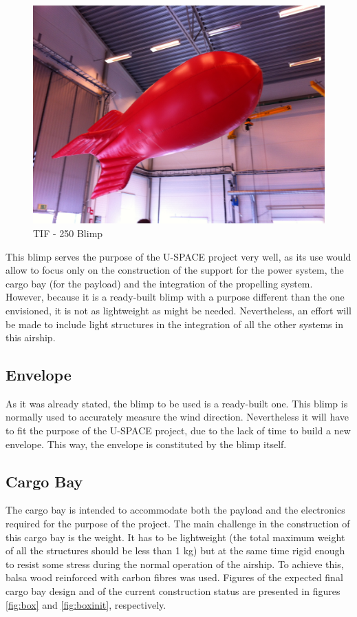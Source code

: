 \begin{figure}[bht]
\centering
\includegraphics[width=\textwidth]{figures/blimp.jpg}
\caption{TIF - 250 Blimp}
\label{fig:blimp}
\end{figure}



This blimp serves the purpose of the U-SPACE project very well, as its use would allow to focus only on the construction of the support for the power system, the cargo bay (for the payload) and the integration of the propelling system. However, because it is a ready-built blimp with a purpose different than the one envisioned, it is not as lightweight as might be needed. Nevertheless, an effort will be made to include light structures in the integration of all the other systems in this airship.

\subsection{Envelope}

As it was already stated, the blimp to be used is a ready-built one. This blimp is normally used to accurately measure the wind direction. Nevertheless it will have to fit the purpose of the U-SPACE project, due to the lack of time to build a new envelope. This way, the envelope is constituted by the blimp itself.  

\subsection{Cargo Bay}

The cargo bay is intended to accommodate both the payload and the electronics required for the purpose of the project. The main challenge in the construction of this cargo bay is the weight. It has to be lightweight (the total maximum weight of all the structures should be less than 1 kg) but at the same time rigid enough to resist some stress during the normal operation of the airship. To achieve this, balsa wood reinforced with carbon fibres was used. Figures of the expected final cargo bay design and of the current construction status are presented in figures \ref{fig:box} and \ref{fig:boxinit}, respectively. 

